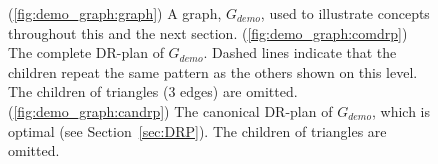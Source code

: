 \begin{figure}
  \caption{
  (\ref{fig:demo_graph:graph}) A graph, $G_{demo}$, used to illustrate concepts throughout this and the next section.
  (\ref{fig:demo_graph:comdrp}) The complete DR-plan of $G_{demo}$.
  Dashed lines indicate that the children repeat the same pattern as the others shown on this level. The children of triangles (3 edges) are omitted.
  (\ref{fig:demo_graph:candrp}) The canonical DR-plan of $G_{demo}$, which is optimal (see Section~\ref{sec:DRP}).
  The children of triangles are omitted.}
  \label{fig:demo_graph}
\end{figure}%




%
%
%
%






